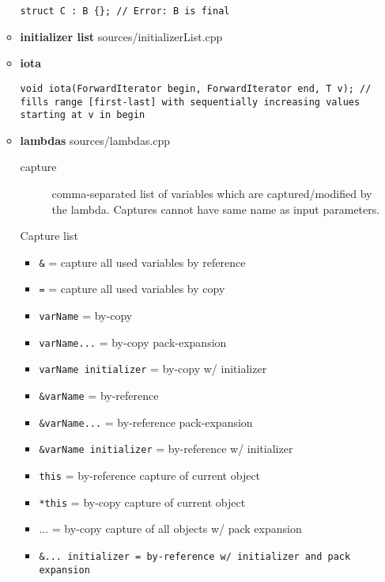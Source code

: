 \documentclass{article}
\begin{document}
\begin{itemize}
\begin{itemize}
\begin{lstlisting}[style=cpp]
struct C : B {}; // Error: B is final
         \end{lstlisting}
          \item \textbf{initializer list}
             {sources/initializerList.cpp}
          \item \textbf{iota}
            \begin{lstlisting}[style=cpp]
void iota(ForwardIterator begin, ForwardIterator end, T v); // fills range [first-last] with sequentially increasing values starting at v in begin
         \end{lstlisting}
          \item \textbf{lambdas}
             {sources/lambdas.cpp}
            \begin{description}
              \item[capture]
                comma-separated list of variables which are captured/modified by the lambda. Captures cannot have same name as input parameters.
            \end{description}
            Capture list
            \begin{itemize}
              \item \verb!&! = capture all used variables by reference
              \item \verb!=! = capture all used variables by copy
              \item \verb!varName! = by-copy
              \item \verb!varName...! = by-copy pack-expansion
              \item \verb!varName initializer! = by-copy  w/ initializer
              \item \verb!&varName! = by-reference
              \item \verb!&varName...! = by-reference pack-expansion
              \item \verb!&varName initializer! = by-reference w/ initializer
              \item \verb!this! = by-reference capture of current object
              \item \verb!*this! = by-copy capture of current object
              \item ... = by-copy capture of all objects w/ pack expansion
              \item \verb!&... initializer = by-reference w/ initializer and pack expansion!
            \end{itemize}
            \begin{lstlisting}[style=cpp]

\end{lstlisting}
\end{itemize}
\end{itemize}
\end{document}
